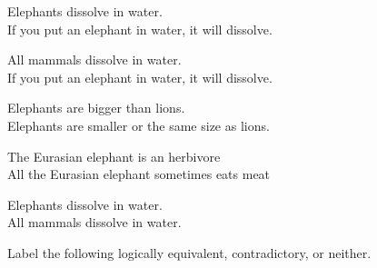  
\begin{exercises}
\item Elephants dissolve in water.	\\
	If you put an elephant in water, it will dissolve.

\item All mammals dissolve in water.\\		
	If you put an elephant in water, it will dissolve. 

\item Elephants are bigger than lions. \\                                                                                        
Elephants are smaller or the same size as lions.

\item The Eurasian elephant is an herbivore \\
All the Eurasian elephant sometimes eats meat

\item Elephants dissolve in water. 	\\	
	All mammals dissolve in water. 

\end{exercises}


\noindent \problempart Label the following logically equivalent, contradictory, or neither. 

